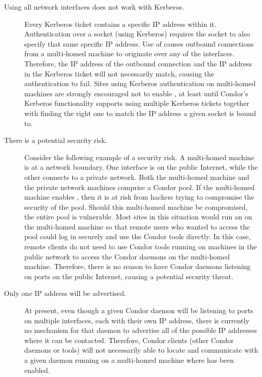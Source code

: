 \begin{description}

\item[Using all network interfaces does not work with Kerberos.] 
  Every Kerberos ticket contains a specific IP address within it.
  Authentication over a socket (using Kerberos) requires
  the socket to also specify that same specific IP address.
  Use of  causes outbound
  connections from a multi-homed machine to 
  originate over any of the interfaces.
  Therefore, the IP address of the outbound connection and the IP
  address in the Kerberos ticket will not necessarily match,
  causing the authentication to fail.
  Sites using Kerberos authentication on multi-homed machines are
  strongly encouraged not to enable ,
  at least until Condor's Kerberos functionality
  supports using multiple Kerberos tickets together with finding the right one
  to match the IP address a given socket is bound to. 

\item[There is a potential security risk.]
  Consider the following example of a security risk.
  A multi-homed machine is at a network boundary.
  One interface is on the public Internet, while the other connects to
  a private network.
  Both the multi-homed machine and the private network machines
  comprise a Condor pool.
  If the multi-homed machine enables ,
  then it is at risk from hackers trying to compromise the security of the pool.
  Should this multi-homed machine be compromised,
  the entire pool is vulnerable.
  Most sites in this situation would run an  on the
  multi-homed machine so that remote users who wanted to access the
  pool could log in securely and use the Condor tools directly.
  In this case, remote clients do not need to use Condor tools running
  on machines in the public network to access the Condor daemons on
  the multi-homed machine.
  Therefore, there is no reason to have Condor daemons listening on
  ports on the public Internet, causing a potential security threat.

\item[Only one IP address will be advertised.]
  At present, even though a given Condor daemon will be listening to
  ports on multiple interfaces, each with their own IP address,
  there is currently no mechanism for that daemon to advertise all of
  the possible IP addresses where it can be contacted.
  Therefore, Condor clients (other Condor daemons or tools) will not
  necessarily able to locate and communicate with a given daemon
  running on a multi-homed machine where
   has been enabled.


\end{description}
